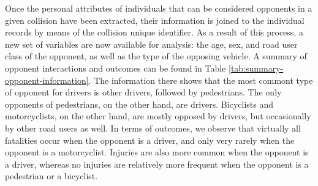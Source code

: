 \documentclass[]{elsarticle} %
\begin{document}
Once the personal attributes of individuals that can be considered
opponents in a given collision have been extracted, their information is
joined to the individual records by means of the collision unique
identifier. As a result of this process, a new set of variables are now
available for analysis: the age, sex, and road user class of the
opponent, as well as the type of the opposing vehicle. A summary of
opponent interactions and outcomes can be found in Table
\ref{tab:summary-opponent-information}. The information there shows that
the most commont type of opponent for drivers is other drivers, followed
by pedestrians. The only opponents of pedestrians, on the other hand,
are drivers. Bicyclists and motorcyclists, on the other hand, are mostly
opposed by drivers, but occasionally by other road users as well. In
terms of outcomes, we observe that virtually all fatalities occur when
the opponent is a driver, and only very rarely when the opponent is a
motorcyclist. Injuries are also more common when the opponent is a
driver, whereas no injuries are relatively more frequent when the
opponent is a pedestrian or a bicyclist.
\end{document}
